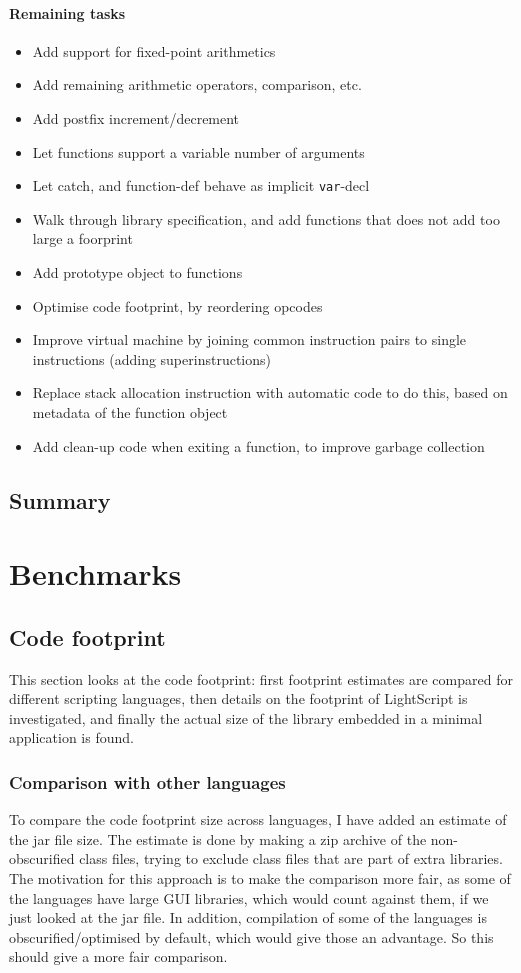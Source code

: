 \documentclass[11pt]{report}
\begin{document}
\subsubsection{Remaining tasks}
\begin{itemize}
\item Add support for fixed-point arithmetics
\item Add remaining arithmetic operators, comparison, etc. 
\item Add postfix increment/decrement
\item Let functions support a variable number of arguments
\item Let catch, and function-def behave as implicit \verb|var|-decl
\item Walk through library specification, and add functions that does not add too large a foorprint
\item Add prototype object to functions
\item Optimise code footprint, by reordering opcodes
\item Improve virtual machine by joining common instruction pairs to single instructions (adding superinstructions)
\item Replace stack allocation instruction with automatic code to do this, based on metadata of the function object 
\item Add clean-up code when exiting a function, to improve garbage collection
\end{itemize}

\section{Summary}
\chapter{Benchmarks}
\label{benchmark}

\section{Code footprint}
This section looks at the code footprint: first footprint estimates are compared for different scripting languages, then details on the footprint of LightScript is investigated, and finally the actual size of the library embedded in a minimal application is found.

\subsection{Comparison with other languages}
To compare the code footprint size across languages, I have added an estimate of the jar file size. 
The estimate is done by making a zip archive of the non-obscurified class files,
trying to exclude class files that are part of extra libraries.
The motivation for this approach is to make the comparison more fair, as some of the languages have large GUI libraries,
which would count against them, if we just looked at the jar file. 
In addition, compilation of some of the languages is obscurified/optimised by default,
which would give those an advantage. So this should give a more fair comparison.
\end{document}
